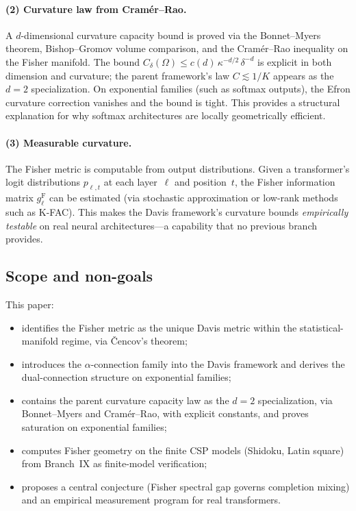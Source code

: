 \documentclass[11pt]{article}
\newcommand{\gF}{g^{\mathrm{F}}}
\theoremstyle{remark}
\begin{document}
\paragraph{(2) Curvature law from Cram\'er--Rao.}
A $d$-dimensional curvature capacity bound is proved via
the Bonnet--Myers theorem, Bishop--Gromov volume comparison, and the
Cram\'er--Rao inequality on the Fisher manifold.  The bound
$C_\delta(\Omega) \le c(d)\,\kappa^{-d/2}\,\delta^{-d}$ is explicit in
both dimension and curvature; the parent framework's law $C \lesssim 1/K$
appears as the $d{=}2$ specialization.
On exponential families (such as softmax outputs), the Efron curvature
correction vanishes and the bound is tight.  This provides a structural
explanation for why softmax architectures are locally geometrically efficient.

\paragraph{(3) Measurable curvature.}
The Fisher metric is computable from output distributions.  Given a
transformer's logit distributions $p_{\ell,t}$ at each layer~$\ell$ and
position~$t$, the Fisher information matrix $\gF_\ell$ can be estimated
(via stochastic approximation or low-rank methods such as K-FAC).  This makes
the Davis framework's curvature bounds \emph{empirically testable} on real
neural architectures---a capability that no previous branch provides.

\subsection{Scope and non-goals}

This paper:
\begin{itemize}
  \item identifies the Fisher metric as the unique Davis metric
  within the statistical-manifold regime, via \v{C}encov's theorem;
  \item introduces the $\alpha$-connection family into the Davis framework
  and derives the dual-connection structure on exponential families;
  \item contains the parent curvature capacity law as the $d{=}2$ specialization, via Bonnet--Myers and
  Cram\'er--Rao, with explicit constants, and proves saturation on exponential
  families;
  \item computes Fisher geometry on the finite CSP models (Shidoku, Latin
  square) from Branch~IX as finite-model verification;
  \item proposes a central conjecture (Fisher spectral gap governs completion
  mixing) and an empirical measurement program for real transformers.
\end{itemize}
\end{document}
